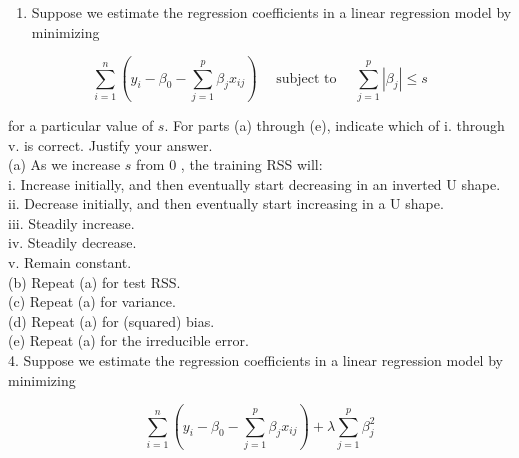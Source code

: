 \documentclass[10pt]{article}
\begin{document}
\begin{enumerate}
(a) The lasso, relative to least squares, is:\\
i. More flexible and hence will give improved prediction accuracy when its increase in bias is less than its decrease in variance.\\
ii. More flexible and hence will give improved prediction accuracy when its increase in variance is less than its decrease in bias.\\
iii. Less flexible and hence will give improved prediction accuracy when its increase in bias is less than its decrease in variance.\\
iv. Less flexible and hence will give improved prediction accuracy when its increase in variance is less than its decrease in bias.\\
(b) Repeat (a) for ridge regression relative to least squares.\\
(c) Repeat (a) for non-linear methods relative to least squares.
  \item Suppose we estimate the regression coefficients in a linear regression model by minimizing
\end{enumerate}

$$
\sum_{i=1}^{n}\left(y_{i}-\beta_{0}-\sum_{j=1}^{p} \beta_{j} x_{i j}\right) \quad \text { subject to } \quad \sum_{j=1}^{p}\left|\beta_{j}\right| \leq s
$$

for a particular value of $s$. For parts (a) through (e), indicate which of i. through v. is correct. Justify your answer.\\
(a) As we increase $s$ from 0 , the training RSS will:\\
i. Increase initially, and then eventually start decreasing in an inverted U shape.\\
ii. Decrease initially, and then eventually start increasing in a U shape.\\
iii. Steadily increase.\\
iv. Steadily decrease.\\
v. Remain constant.\\
(b) Repeat (a) for test RSS.\\
(c) Repeat (a) for variance.\\
(d) Repeat (a) for (squared) bias.\\
(e) Repeat (a) for the irreducible error.\\
4. Suppose we estimate the regression coefficients in a linear regression model by minimizing

$$
\sum_{i=1}^{n}\left(y_{i}-\beta_{0}-\sum_{j=1}^{p} \beta_{j} x_{i j}\right)+\lambda \sum_{j=1}^{p} \beta_{j}^{2}
$$
\end{document}
